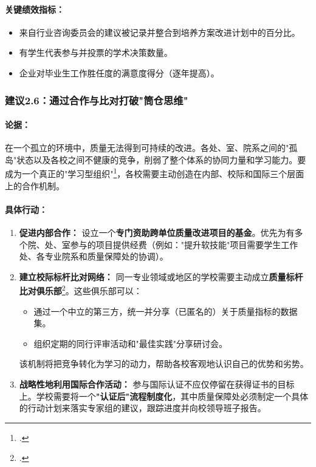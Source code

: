 \paragraph{关键绩效指标：}
\begin{itemize}
    \item 来自行业咨询委员会的建议被记录并整合到培养方案改进计划中的百分比。
    \item 有学生代表参与并投票的学术决策数量。
    \item 企业对毕业生工作胜任度的满意度得分（逐年提高）。
\end{itemize}

\subsubsection{建议2.6：通过合作与比对打破"筒仓思维"}

\paragraph{论据：}
在一个孤立的环境中，质量无法得到可持续的改进。各处、室、院系之间的"孤岛"状态以及各校之间不健康的竞争，削弱了整个体系的协同力量和学习能力。要成为一个真正的"学习型组织"\footcite{Senge2006}，各校需要主动创造在内部、校际和国际三个层面上的合作机制。

\paragraph{具体行动：}
\begin{enumerate}
    \item \textbf{促进内部合作：} 设立一个\textbf{专门资助跨单位质量改进项目的基金}。优先为有多个院、处、室参与的项目提供经费（例如："提升软技能"项目需要学生工作处、各专业院系和质量保障处的协调）。
    
    \item \textbf{建立校际标杆比对网络：} 同一专业领域或地区的学校需要主动成立\textbf{质量标杆比对俱乐部}\footcite{jackson_lund_2000}。这些俱乐部可以：
        \begin{itemize}
            \item 通过一个中立的第三方，统一并分享（已匿名的）关于质量指标的数据集。
            \item 组织定期的同行评审活动和"最佳实践"分享研讨会。
        \end{itemize}
    该机制将把竞争转化为学习的动力，帮助各校客观地认识自己的优势和劣势。

    \item \textbf{战略性地利用国际合作活动：} 参与国际认证不应仅停留在获得证书的目标上。学校需要将一个\textbf{"认证后"流程制度化}，其中质量保障处必须制定一个具体的行动计划来落实专家组的建议，跟踪进度并向校领导班子报告。
\end{enumerate}

